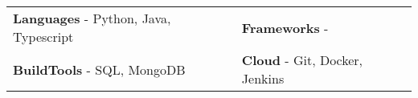 \newcommand{\skillItem}[2]{
    \begin{minipage}[t]{0.45\textwidth} %
        {\textbf{#1}} - {#2}
    \end{minipage}
}

\section{}
\begin{tabular}{@{}ll@{}}
    \skillItem{Languages}{Python, Java, Typescript} & \skillItem{Frameworks}{} \\
    \skillItem{BuildTools}{SQL, MongoDB} & \skillItem{Cloud} {Git, Docker, Jenkins} \\
\end{tabular}